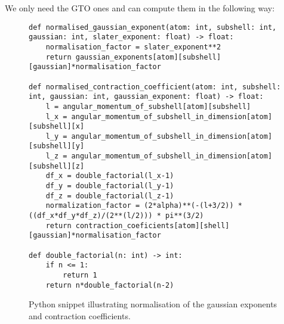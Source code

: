 We only need the GTO ones and can compute them in the following way:
\begin{figure}[H]
\begin{verbatim}
def normalised_gaussian_exponent(atom: int, subshell: int, gaussian: int, slater_exponent: float) -> float:
    normalisation_factor = slater_exponent**2
    return gaussian_exponents[atom][subshell][gaussian]*normalisation_factor

def normalised_contraction_coefficient(atom: int, subshell: int, gaussian: int, gaussian_exponent: float) -> float:
    l = angular_momentum_of_subshell[atom][subshell]
    l_x = angular_momentum_of_subshell_in_dimension[atom][subshell][x]
    l_y = angular_momentum_of_subshell_in_dimension[atom][subshell][y]
    l_z = angular_momentum_of_subshell_in_dimension[atom][subshell][z]
    df_x = double_factorial(l_x-1)
    df_y = double_factorial(l_y-1)
    df_z = double_factorial(l_z-1)
    normalization_factor = (2*alpha)**(-(l+3/2)) * ((df_x*df_y*df_z)/(2**(l/2))) * pi**(3/2)
    return contraction_coeficients[atom][shell][gaussian]*normalisation_factor

def double_factorial(n: int) -> int:
    if n <= 1:
        return 1
    return n*double_factorial(n-2)
\end{verbatim}
    \caption{Python snippet illustrating normalisation of the gaussian exponents and contraction coefficients.}
\end{figure}

